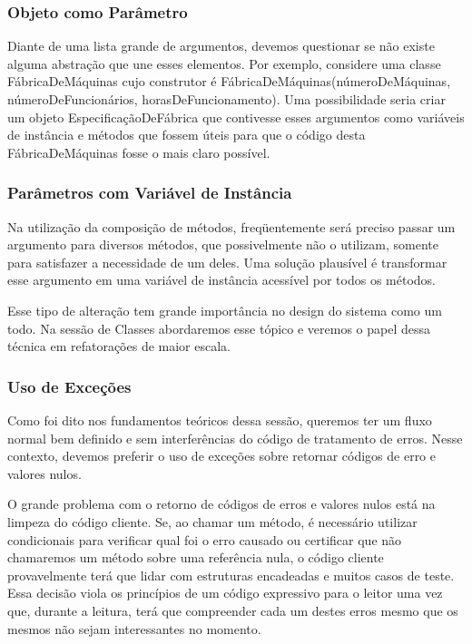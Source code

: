 


\subsubsection{Objeto como Parâmetro}
Diante de uma lista grande de argumentos, devemos questionar se não existe alguma abstração que une esses elementos. Por exemplo, considere uma classe FábricaDeMáquinas cujo construtor é FábricaDeMáquinas(númeroDeMáquinas, númeroDeFuncionários, horasDeFuncionamento). Uma possibilidade seria criar um objeto EspecificaçãoDeFábrica que contivesse esses argumentos como variáveis de instância e métodos que fossem úteis para que o código desta FábricaDeMáquinas fosse o mais claro possível.

\subsubsection{Parâmetros com Variável de Instância}
Na utilização da composição de métodos, freqüentemente será preciso passar um argumento para diversos métodos, que possivelmente não o utilizam, somente para satisfazer a necessidade de um deles. Uma solução plausível é transformar esse argumento em uma variável de instância acessível por todos os métodos.
	
Esse tipo de alteração tem grande importância no design do sistema como um todo. Na sessão de Classes abordaremos esse tópico e veremos o papel dessa técnica em refatorações de maior escala.

\subsubsection{Uso de Exceções}
Como foi dito nos fundamentos teóricos dessa sessão, queremos ter um fluxo normal bem definido e sem interferências do código de tratamento de erros. Nesse contexto, devemos preferir o uso de exceções sobre retornar códigos de erro e valores nulos.
	
O grande problema com o retorno de códigos de erros e valores nulos está na limpeza do código cliente. Se, ao chamar um método, é necessário utilizar condicionais para verificar qual foi o erro causado ou certificar que não chamaremos um método sobre uma referência nula, o código cliente provavelmente terá que lidar com estruturas encadeadas e muitos casos de teste. Essa decisão viola os princípios de um código expressivo para o leitor uma vez que, durante a leitura, terá que compreender cada um destes erros mesmo que os mesmos não sejam interessantes no momento.

